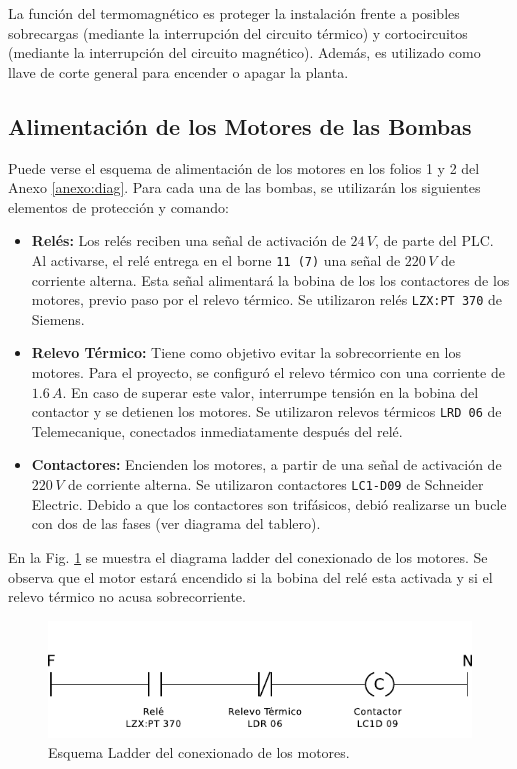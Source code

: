 La función del termomagnético es proteger la instalación frente a posibles
sobrecargas (mediante la interrupción del circuito térmico) y cortocircuitos
(mediante la interrupción del circuito magnético).
Además, es utilizado como llave de corte general para encender o apagar la
planta.

\subsection{Alimentación de los Motores de las Bombas}
\label{subsec:alimentacionMotores}
Puede verse el esquema de alimentación de los motores en los folios 1 y 2 del
Anexo \ref{anexo:diag}.
Para cada una de las bombas, se utilizarán los siguientes elementos de
protección y comando:
\begin{itemize}
 \item \textbf{Relés:}
 Los relés reciben una señal de activación de $24\,V$, de parte del PLC.
 Al activarse, el relé entrega en el borne \verb|11 (7)| una señal de $220\,V$
de corriente alterna.
Esta señal alimentará la bobina de los los contactores de los motores, previo 
paso por el relevo térmico. Se utilizaron relés \verb|LZX:PT 370| de Siemens.
 \item \textbf{Relevo Térmico:}
 Tiene como objetivo evitar la sobrecorriente en los motores.
 Para el proyecto, se configuró el relevo térmico con una corriente
 de $1.6\,A$.
 En caso de superar este valor, interrumpe tensión en la bobina
 del contactor y se detienen los motores.
 Se utilizaron relevos térmicos \verb|LRD 06| de Telemecanique, conectados
inmediatamente después del relé.
 \item \textbf{Contactores:}
 Encienden los motores, a partir de una señal de activación de $220\,V$ de
corriente alterna.
Se utilizaron contactores \verb|LC1-D09| de Schneider Electric.
Debido a que los contactores son trifásicos, debió realizarse un bucle con dos
de las fases (ver diagrama del tablero).
\end{itemize}

En la Fig. \ref{fig:diagramaLadderContactor} se muestra el diagrama ladder
del conexionado de los motores.
Se observa que  el motor estará encendido si la bobina del relé esta activada y
si el relevo térmico no acusa sobrecorriente.

\begin{figure}
 \centering
 \includegraphics[scale=1.1]{Cap3-TableroElectrico/Images/ladderConexion.pdf}
 \caption{Esquema Ladder del conexionado de los motores.}
 \label{fig:diagramaLadderContactor}
\end{figure}

